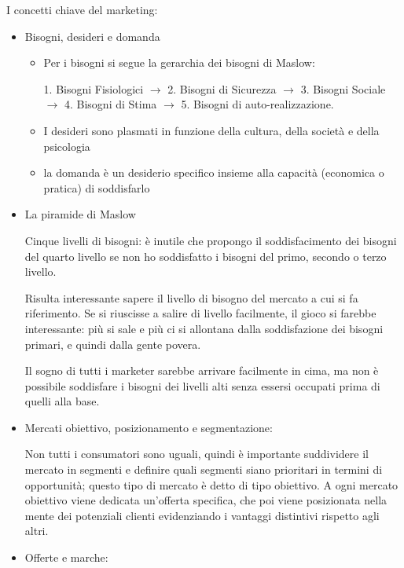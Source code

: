 \documentclass[11pt]{article}
\begin{document}
\noindent I concetti chiave del marketing: 
\begin{itemize}[topsep=0ex] %
	\item Bisogni, desideri e domanda
	\begin{itemize}[topsep=0ex,noitemsep]
		\item Per i bisogni si segue la gerarchia dei bisogni di Maslow:
		
		1. Bisogni Fisiologici $\to$ 2. Bisogni di Sicurezza 
		$\to$ 3. Bisogni Sociale $\to$ 4. Bisogni di Stima $\to$
		5. Bisogni di auto-realizzazione.
		
		\item I desideri sono plasmati in funzione della cultura, della società e della psicologia
		\item la domanda è un desiderio specifico insieme alla capacità (economica o pratica) di soddisfarlo
	\end{itemize}
	
	\item La piramide di Maslow
	
	Cinque livelli di bisogni: è inutile che propongo il soddisfacimento dei bisogni del quarto livello se non ho soddisfatto i bisogni del primo, secondo o terzo livello.
	
	Risulta interessante sapere il livello di bisogno del mercato a cui si fa riferimento. Se si riuscisse a salire di livello facilmente, il gioco si farebbe interessante: più si sale e più ci si allontana dalla soddisfazione dei bisogni primari, e quindi dalla gente povera.
	
	Il sogno di tutti i marketer sarebbe arrivare facilmente in cima, ma non è possibile soddisfare i bisogni dei livelli alti senza essersi occupati prima di quelli alla base.
	
	\item Mercati obiettivo, posizionamento e segmentazione:
	
	Non tutti i consumatori sono uguali, quindi è importante suddividere il mercato in segmenti e definire quali segmenti siano prioritari in termini di opportunità; questo tipo di mercato è detto di tipo obiettivo. A ogni mercato obiettivo viene dedicata un'offerta specifica, che poi viene posizionata nella mente dei potenziali clienti evidenziando i vantaggi distintivi rispetto agli altri.
	\item Offerte e marche:
	

\end{itemize}
\end{document}
